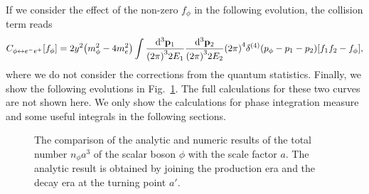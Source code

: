 \documentclass{article}
\begin{document}
        If we consider the effect of the non-zero $f_\phi$ in the following evolution, the collision term reads
        \begin{equation}
            C_{\phi \leftrightarrow e^- e^+}[f_\phi] = 2 y^2 \qty(m_\phi^2 - 4 m_e^2) \int \frac{\dd[3]{\vb{p}_1}}{\qty(2 \pi)^3 2 E_1} \frac{\dd[3]{\vb{p}_2}}{\qty(2 \pi)^3 2 E_2} \qty(2 \pi)^4 \delta^{(4)}\qty(p_\phi - p_1 - p_2) \qty[f_1 f_2 - f_\phi],
            \label{eq:collision-term-φee-classical-full}
        \end{equation}
        where we do not consider the corrections from the quantum statistics.
        Finally, we show the following evolutions in Fig.~\ref{fig:n_φ-a^3-comparison-of-analytic-and-numeric}.
        The full calculations for these two curves are not shown here.
        We only show the calculations for phase integration measure and some useful integrals in the following sections.

        \begin{figure}
            \centering
            \caption{
                The comparison of the analytic and numeric results of the total number $n_\phi a^3$ of the scalar boson $\phi$ with the scale factor $a$.
                The analytic result is obtained by joining the production era and the decay era at the turning point $a'$.
            }
            \label{fig:n_φ-a^3-comparison-of-analytic-and-numeric}
        \end{figure}
\end{document}
